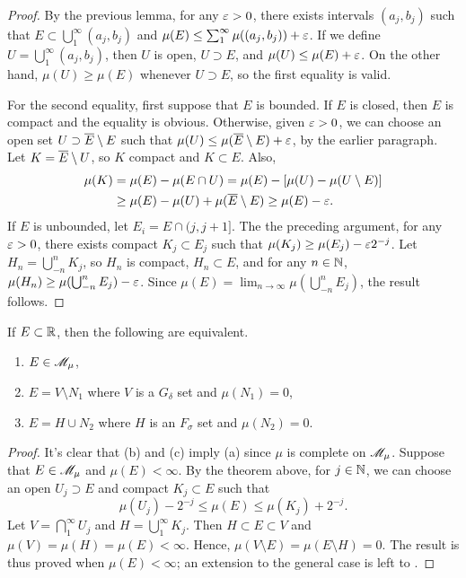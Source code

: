\documentclass[12pt]{article} %
\begin{document}
\begin{proof}
    By the previous lemma, for any $\varepsilon > 0$, there exists intervals $(a_j, b_j)$ such that $E \subset \bigcup_1^\infty (a_j, b_j)$ and $\mu(E) \leq \sum_1^\infty \mu((a_j, b_j)) + \varepsilon$. If we define $U = \bigcup_1^\infty (a_j, b_j)$, then $U$ is open, $U \supset E$, and $\mu(U) \leq \mu(E) + \varepsilon$. On the other hand, $\mu(U) \geq \mu(E)$ whenever $U \supset E$, so the first equality is valid.

    For the second equality, first suppose that $E$ is bounded. If $E$ is closed, then $E$ is compact and the equality is obvious. Otherwise, given $\varepsilon > 0$, we can choose an open set $U \supset \overline{E} \setminus E$ such that $\mu(U) \leq \mu(\overline{E} \setminus E) + \varepsilon$, by the earlier paragraph. Let $K = \overline{E} \setminus U$, so $K$ compact and $K \subset E$. Also, \begin{align*}
        \mu(K) &= \mu(E) - \mu(E \cap U) = \mu(E) - [\mu(U) - \mu(U\setminus E)]\\
        &\geq \mu(E) - \mu(U) + \mu(\overline{E}\setminus E) \geq \mu(E) - \varepsilon.
    \end{align*}
    If $E$ is unbounded, let $E_i = E \cap (j, j+1]$. The the preceding argument, for any $\varepsilon > 0$, there exists compact $K_j \subset E_j$ such that $\mu(K_j) \geq \mu(E_j) - \varepsilon2^{-j}$. Let $H_n = \bigcup_{-n}^{n} K_j$, so $H_n$ is compact, $H_n \subset E$, and for any $n \in \mathbb{N}$, $\mu(H_n) \geq \mu(\bigcup_{-n}^{n} E_j) - \varepsilon$. Since $\mu(E) = \lim_{n \to \infty} \mu(\bigcup_{-n}^{n}E_j)$, the result follows.
\end{proof}

\begin{theorem}
    If $E \subset \mathbb{R}$, then the following are equivalent.\begin{enumerate}
        \item $E \in \mathscr{M}_\mu$,
        \item $E = V \setminus N_1$ where $V$ is a $G_\delta$ set and $\mu(N_1) = 0$,
        \item $E = H \cup N_2$ where $H$ is an $F_\sigma$ set and $\mu(N_2) = 0$.
    \end{enumerate}
\end{theorem}

\begin{proof}
    It's clear that (b) and (c) imply (a) since $\mu$ is complete on $\mathscr{M}_\mu$. Suppose that $E \in \mathscr{M}_\mu$ and $\mu(E) < \infty$. By the theorem above, for $j \in \mathbb{N}$, we can choose an open $U_j \supset E$ and compact $K_j \subset E$ such that \[\mu(U_j) - 2^{-j} \leq \mu(E) \leq \mu(K_j) + 2^{-j}.\]
    Let $V = \bigcap_1^\infty U_j$ and $H = \bigcup_1^\infty K_j$. Then $H \subset E \subset V$ and $\mu(V) = \mu(H) = \mu(E) < \infty$. Hence, $\mu(V \setminus E) = \mu(E \setminus H) = 0$. The result is thus proved when $\mu(E) < \infty$; an extension to the general case is left to \citet[Exercise~25]{folland1999real}.
\end{proof}
\end{document}

